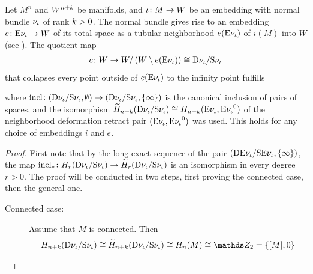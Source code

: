 \begin{Lem}\label{lem:thomisofundcl}
  Let $M^n$ and $W^{n+k}$ be manifolds, and
  ${\iota}\colon M\to W$ be an embedding with
  normal bundle $\nu_{{\iota}}$ of rank $k>0$.
  The normal bundle gives rise to an embedding
  $e\colon \mathrm{E}\nu_{{\iota}}\to W$ of its total space
  as a tubular neighborhood $e(\mathrm{E}\nu_{{\iota}})$ of $i(M)$ into $W$
  (see \cite[Sec.~15.6]{tomdieck}).
  The quotient map
  \begin{gather*}
    c\colon
     W
    \to  W/\left(  W\setminus e(\mathrm{E}\nu_{{\iota}}) \right)
    \cong \mathrm{D}\nu_{{\iota}}/\mathrm{S}\nu_{{\iota}}
  \end{gather*}
  that collapses every point outside of $e(\mathrm{E}\nu_{{\iota}})$ to the infinity
  point fulfills
  \begin{center}
  \end{center}
  where
  $\mathrm{incl}\colon
  (\mathrm{D}\nu_{{\iota}}/\mathrm{S}\nu_{{\iota}},\emptyset)
  \to(\mathrm{D}\nu_{{\iota}}/\mathrm{S}\nu_{{\iota}}, \{\infty\})$
  is the canonical inclusion of pairs of spaces,
  and the isomorphism
  $\widetilde{H}_{n+k}(\mathrm{D}\nu_{{\iota}}/\mathrm{S}\nu_{{\iota}})
  \cong H_{n+k}(\mathrm{E}\nu_{{\iota}}, {\mathrm{E}\nu_{{\iota}}}^0)$
  of the neighborhood deformation retract pair
  $(\mathrm{E}\nu_{{\iota}}, {\mathrm{E}\nu_{{\iota}}}^0)$ was used.
  This holds for any choice of embeddings $i$ and $e$.
  \begin{proof}
    First note that by the long exact sequence of the pair 
    $(\mathrm{D}\mathrm{E}\nu_{{\iota}}/\mathrm{S}\mathrm{E}\nu_{{\iota}}, \{\infty\})$, the map
    ${\mathrm{incl}}_*\colon
    H_r(\mathrm{D}\nu_{{\iota}}/\mathrm{S}\nu_{{\iota}})
    \to \widetilde{H}_r(\mathrm{D}\nu_{{\iota}}/\mathrm{S}\nu_{{\iota}})$
    is an isomorphism in every degree $r>0$. The proof will be
    conducted in two steps, first proving the connected case, then
    the general one.
    \begin{description}
    \item[Connected case:]
      Assume that $M$ is connected.
      Then
      \begin{gather*}
        \H_{n+k}(\Thomspace{\N{\emb}})
        \cong\relH_{n+k}(\Thomspace{\N{\emb}})
        \cong \H_n(M) \cong \Zmod2=\{\fundcl M, 0\}

\end{gather*}
\end{description}
\end{proof}
\end{Lem}
